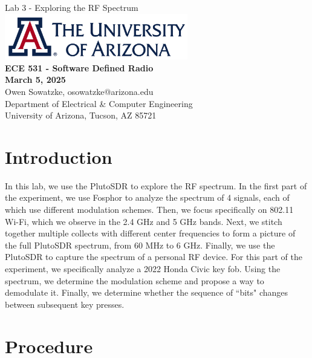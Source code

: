 \documentclass{article}
\begin{document}
\begin{titlepage}
	\centering
	{\huge Lab 3 - Exploring the RF Spectrum}\\[0.25 in]
	\includegraphics[width=0.6\textwidth]{ua_logo.png}\\[0.25 in]
	{\large \textbf{ECE 531 - Software Defined Radio\\[0.25 in]
	March 5, 2025\\[0.25 in]}}
	{\large Owen Sowatzke, osowatzke@arizona.edu\\[0.05 in]
	Department of Electrical \& Computer Engineering\\[0.05 in]
	University of Arizona, Tucson, AZ 85721\\[0.5 in]}
	\hypersetup{linkcolor=navy-blue}
	\noindent\hrulefill
	\tableofcontents
	\noindent\hrulefill
\end{titlepage}

\setlength{\parindent}{0pt}

\section{Introduction}

In this lab, we use the PlutoSDR to explore the RF spectrum. In the first part of the experiment, we use Fosphor to analyze the spectrum of 4 signals, each of which use different modulation schemes. Then, we focus specifically on 802.11 Wi-Fi, which we observe in the 2.4 GHz and 5 GHz bands. Next, we stitch together multiple collects with different center frequencies to form a picture of the full PlutoSDR spectrum, from 60 MHz to 6 GHz. Finally, we use the PlutoSDR to capture the spectrum of a personal RF device. For this part of the experiment, we specifically analyze a 2022 Honda Civic key fob. Using the spectrum, we determine the modulation scheme and propose a way to demodulate it. Finally, we determine whether the sequence of ``bits" changes between subsequent key presses.

\section{Procedure}
\end{document}
